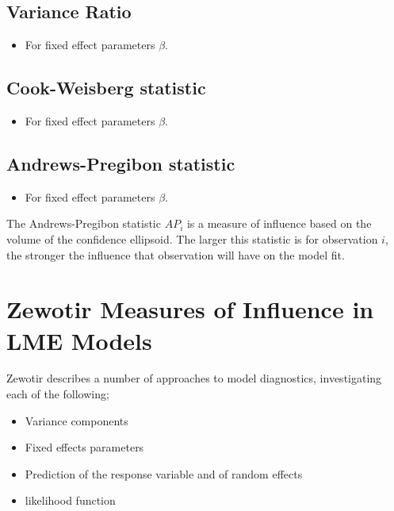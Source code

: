 \documentclass[Main.tex]{subfiles}
\begin{document}
	
	\subsection{Variance Ratio} %
	\begin{itemize}
		\item For fixed effect parameters $\beta$.
	\end{itemize}
	
	
	\subsection{Cook-Weisberg statistic} %
	\begin{itemize}
		\item For fixed effect parameters $\beta$.
	\end{itemize}
	

	\subsection{Andrews-Pregibon statistic} %
		\begin{itemize}
			\item For fixed effect parameters $\beta$.
		\end{itemize}
		The Andrews-Pregibon statistic $AP_{i}$ is a measure of influence based on the volume of the confidence ellipsoid.
		The larger this statistic is for observation $i$, the stronger the influence that observation will have on the model fit.

		
	
	
	
	\section{Zewotir Measures of Influence in LME Models}%
	Zewotir describes a number of approaches to model diagnostics, investigating each of the following;
	\begin{itemize}
		\item Variance components
		\item Fixed effects parameters
		\item Prediction of the response variable and of random effects
		\item likelihood function
	\end{itemize}
	
\end{document}
